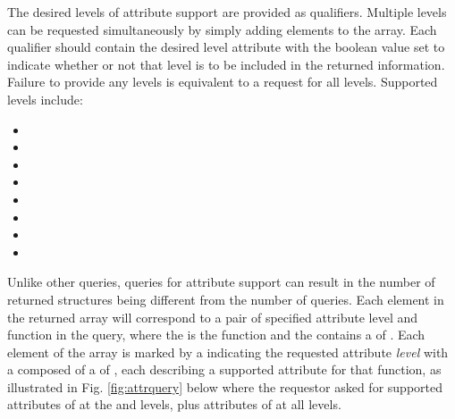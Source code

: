 The desired levels of attribute support are provided as qualifiers. Multiple levels can be requested simultaneously by simply adding elements to the  array. Each qualifier should contain the desired level attribute with the boolean value set to indicate whether or not that level is to be included in the returned information. Failure to provide any levels is equivalent to a request for all levels. Supported levels include:

\begin{itemize}
    \item {}
    \item {}
    \item {}
    \item {}
    \item {}
    \item {}
    \item {}
    \item {}
\end{itemize}

Unlike other queries, queries for attribute support can result in the number of returned  structures being different from the number of queries. Each element in the returned array will correspond to a pair of specified attribute level and function in the query, where the  is the function and the  contains a  of . Each element of the array is marked by a  indicating the requested attribute \emph{level} with a  composed of a  of , each describing a supported attribute for that function, as illustrated in Fig. \ref{fig:attrquery} below where the requestor asked for supported attributes of  at the  and  levels, plus attributes of  at all levels.

